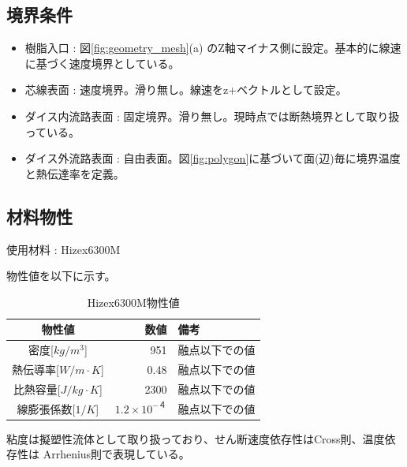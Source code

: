 \documentclass[report]{jlreq}
\begin{document}
\newpage

\subsection{境界条件}

\begin{itemize}
  \item 樹脂入口 : 図\ref{fig:geometry_mesh}(a) のZ軸マイナス側に設定。基本的に線速に基づく速度境界としている。
  \item 芯線表面 : 速度境界。滑り無し。線速をz+ベクトルとして設定。
  \item ダイス内流路表面 : 固定境界。滑り無し。現時点では断熱境界として取り扱っている。
  \item ダイス外流路表面 : 自由表面。図\ref{fig:polygon}に基づいて面({\small 辺})毎に境界温度と熱伝達率を定義。
\end{itemize}

\subsection{材料物性}
使用材料 : Hizex6300M

物性値を以下に示す。
\begin{table}
\centering
\caption[Hizex6300M物性値]{Hizex6300M物性値}  
\label{Hizex6300M}
\setlength{\tabcolsep}{5pt}
\begin{tabular}{|c|r|l|}\hline
物性値 & 数値 & 備考\\ \hline
密度[$kg/m^3$] & 951 & 融点以下での値\\ \hline
熱伝導率[$W/m\cdot K$] & 0.48 & 融点以下での値\\ \hline
比熱容量[$J/kg\cdot K$] & 2300 & 融点以下での値\\ \hline
線膨張係数[$1/K$] & $1.2\times10^{-４}$ &融点以下での値\\ \hline
\end{tabular}
\end{table}%

粘度は擬塑性流体として取り扱っており、せん断速度依存性はCross則、温度依存性は Arrhenius則で表現している。
\end{document}
